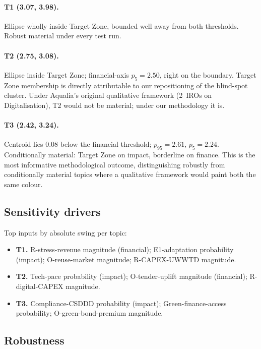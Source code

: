 \documentclass[11pt, a4paper]{article}
\begin{document}
\paragraph{T1 (3.07, 3.98).}
Ellipse wholly inside Target Zone, bounded well away from both thresholds. Robust material under every test run.

\paragraph{T2 (2.75, 3.08).}
Ellipse inside Target Zone; financial-axis $p_5 = 2.50$, right on the boundary. Target Zone membership is directly attributable to our repositioning of the blind-spot cluster. Under Aqualia's original qualitative framework (2~IROs on Digitalisation), T2 would not be material; under our methodology it is.

\paragraph{T3 (2.42, 3.24).}
Centroid lies 0.08 below the financial threshold; $p_{95} = 2.61$, $p_5 = 2.24$. Conditionally material: Target Zone on impact, borderline on finance. This is the most informative methodological outcome, distinguishing robustly from conditionally material topics where a qualitative framework would paint both the same colour.

\subsection{Sensitivity drivers}
\label{ssec:sensitivity}

Top inputs by absolute swing per topic:
\begin{itemize}
\item \textbf{T1.} R-stress-revenue magnitude (financial); E1-adaptation probability (impact); O-reuse-market magnitude; R-CAPEX-UWWTD magnitude.
\item \textbf{T2.} Tech-pace probability (impact); O-tender-uplift magnitude (financial); R-digital-CAPEX magnitude.
\item \textbf{T3.} Compliance-CSDDD probability (impact); Green-finance-access probability; O-green-bond-premium magnitude.
\end{itemize}

\subsection{Robustness}
\end{document}
